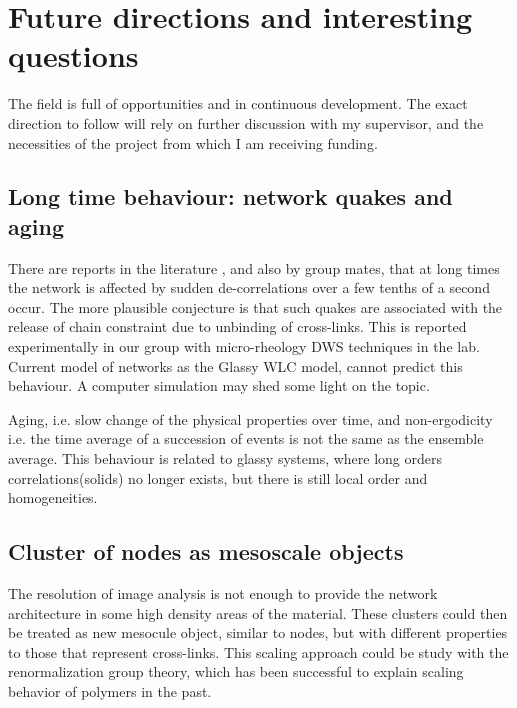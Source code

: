 \section{Future directions and interesting questions}

The field is full of opportunities and in continuous development. The exact
direction to follow will rely on further discussion with my supervisor, and the necessities
of the project from which I am receiving funding.



\subsection{Long time behaviour: network quakes and aging}
There are reports in the literature \citep{kajiya_slow_2013}, and also by group
mates, that at long times the network is affected by sudden de-correlations over
a few tenths of a second occur. The more plausible conjecture is that such quakes are associated with the release of chain constraint due to unbinding of
cross-links. This is reported experimentally in our group with micro-rheology
DWS techniques in the lab. Current model of networks as the Glassy WLC model,
cannot predict this behaviour. A computer simulation may shed some light on the
topic.

Aging, i.e. slow change of the physical properties over time, and non-ergodicity
i.e. the time average of a succession of events is not the same as the
ensemble average. This behaviour is related to glassy systems, where long
orders correlations(solids) no longer exists, but there is still local order and
homogeneities.\citep{cipelletti_slow_????}

\subsection{Cluster of nodes as mesoscale objects}
The resolution of image analysis is not enough to provide the network
architecture in some high density areas of the material. These clusters could
then be treated as new mesocule object, similar to nodes, but with different
properties to those that represent cross-links. This scaling approach could be
study with the renormalization group theory, which has been successful to explain
scaling behavior of polymers in the past.\citep{gennes_scaling_1979}


